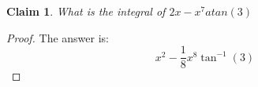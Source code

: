 \documentclass{article}
\newtheorem{theorem}{Claim}
\begin{document}
\begin{theorem}
What is the integral of $ 2x - x^7atan(3) $
\end{theorem}

\begin{proof}
The answer is:
\[
x^2-\frac{1}{8} x^8 \tan ^{-1}(3)
\]
\end{proof}
\end{document}
